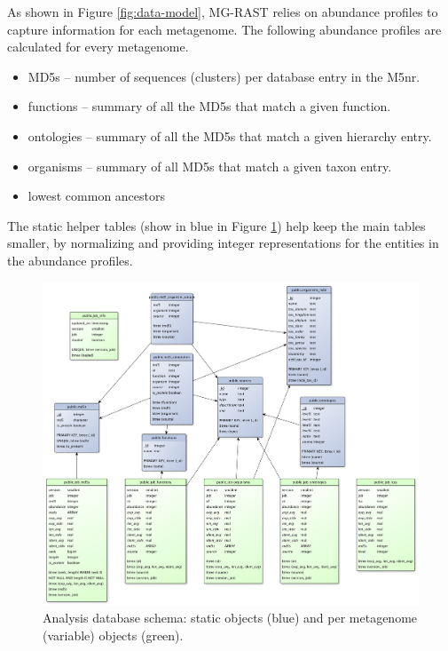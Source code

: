 \documentclass[12pt,fullpage]{report}
\begin{document}
As shown in Figure \ref{fig:data-model}, MG-RAST relies on abundance profiles to capture information for each metagenome.
The following abundance profiles are calculated for every metagenome.

\begin{itemize}
\item MD5s --
number of sequences (clusters) per database entry in the M5nr.

\item functions --
summary of all the MD5s that match a given function.

\item ontologies --
summary of all the MD5s that match a given hierarchy entry.

\item organisms --
summary of all MD5s that match a given taxon entry.

\item lowest common ancestors
\end{itemize}

The static helper tables (show in blue in Figure \ref{fig:mgrast_analysis-schema}) help
keep the main tables smaller, by normalizing and providing integer representations for the entities in the abundance profiles.

\begin{figure}
\begin{center}
\includegraphics[width=6in]{Images/mgrast_analysis-schema.png}
\end{center}
\caption{
Analysis database schema: static objects (blue) and per metagenome (variable) objects (green).
}
\label{fig:mgrast_analysis-schema}
\end{figure}
\end{document}
